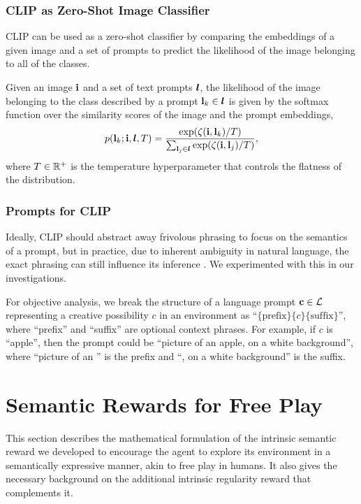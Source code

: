 \subsubsection{CLIP as Zero-Shot Image Classifier}
\label{sec:clip-classifier}
CLIP can be used as a zero-shot classifier by comparing the embeddings of a given image and a set of prompts to predict the likelihood of the image belonging to all of the classes.

Given an image \(\mathbf{i}\) and a set of text prompts \(\bm{l}\), the likelihood of the image belonging to the class described by a prompt \(\mathbf{l}_k \in \bm{l}\) is given by the softmax function over the similarity scores of the image and the prompt embeddings,
\begin{equation}
    \label{eq:clip-dist}
    p(\mathbf{l}_k; \mathbf{i}, \bm{l}, T) = \dfrac{\exp(\zeta(\mathbf{i}, \mathbf{l}_k)/T)}{\sum_{\mathbf{l}_j \in \bm{l}} \exp(\zeta(\mathbf{i}, \mathbf{l}_j)/T)},
\end{equation}
where \(T \in \mathbb{R}^+\) is the temperature hyperparameter that controls the flatness of the distribution.

\subsubsection{Prompts for CLIP}
\label{sec:prompt-engineering}
Ideally, CLIP should abstract away frivolous phrasing to focus on the semantics of a prompt, but in practice, due to inherent ambiguity in natural language, the exact phrasing can still influence its inference \citep{waffleclip}. 
We experimented with this in our investigations.

For objective analysis, we break the structure of a language prompt \(\mathbf{c} \in \mathcal{L}\) representing a creative possibility \(c\) in an environment as ``\(\{\text{prefix}\}\{c\}\{\text{suffix}\}\)'', where ``prefix'' and ``suffix'' are optional context phrases. For example, if \(c\) is ``apple'', then the prompt could be ``picture of an apple, on a white background'', where ``picture of an '' is the prefix and ``, on a white background'' is the suffix.

\section{Semantic Rewards for Free Play}
\label{sec:semantics-reward}
This section describes the mathematical formulation of the intrinsic semantic reward we developed to encourage the agent to explore its environment in a semantically expressive manner, akin to free play in humans.
It also gives the necessary background on the additional intrinsic regularity reward that complements it.

